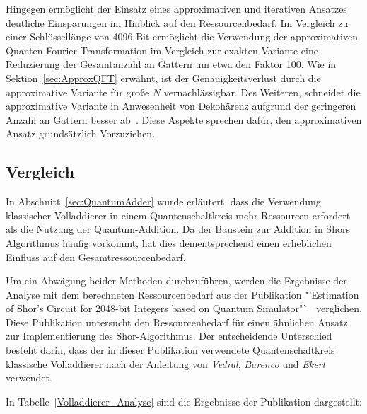 Hingegen ermöglicht der Einsatz eines approximativen und iterativen Ansatzes deutliche Einsparungen im Hinblick auf den Ressourcenbedarf. 
Im Vergleich zu einer Schlüssellänge von 4096-Bit ermöglicht die Verwendung der approximativen Quanten-Fourier-Transformation im Vergleich zur exakten Variante eine Reduzierung der Gesamtanzahl an Gattern um etwa den Faktor 100.
Wie in Sektion~\ref{sec:ApproxQFT} erwähnt, ist der Genauigkeitsverlust durch die approximative Variante für große \(N\) vernachlässigbar. 
Des Weiteren, schneidet die approximative Variante in Anwesenheit von Dekohärenz aufgrund der geringeren Anzahl an Gattern besser ab~\cite{Barenco_1996}. 
Diese Aspekte sprechen dafür, den approximativen Ansatz grundsätzlich Vorzuziehen.

\subsection*{Vergleich}
In Abschnitt~\ref{sec:QuantumAdder} wurde erläutert, 
dass die Verwendung klassischer Volladdierer in einem Quantenschaltkreis mehr Ressourcen erfordert als die Nutzung der Quantum-Addition. 
Da der Baustein zur Addition in Shors Algorithmus häufig vorkommt, 
hat dies dementsprechend einen erheblichen Einfluss auf den Gesamtressourcenbedarf.

Um ein Abwägung beider Methoden durchzuführen, 
werden die Ergebnisse der Analyse mit dem berechneten Ressourcenbedarf aus der Publikation "'Estimation of Shor’s Circuit for 2048-bit Integers
based on Quantum Simulator"`~\cite{cryptoeprint:2023/092} verglichen. 
Diese Publikation untersucht den Ressourcenbedarf für einen ähnlichen Ansatz zur Implementierung des Shor-Algorithmus.
Der entscheidende Unterschied besteht darin, 
dass der in dieser Publikation verwendete Quantenschaltkreis klassische Volladdierer nach der Anleitung von 
\textit{Vedral}, \textit{Barenco} und \textit{Ekert}\cite{Vedral_1996} verwendet.

In Tabelle~\ref{Volladdierer_Analyse} sind die Ergebnisse der Publikation dargestellt:

